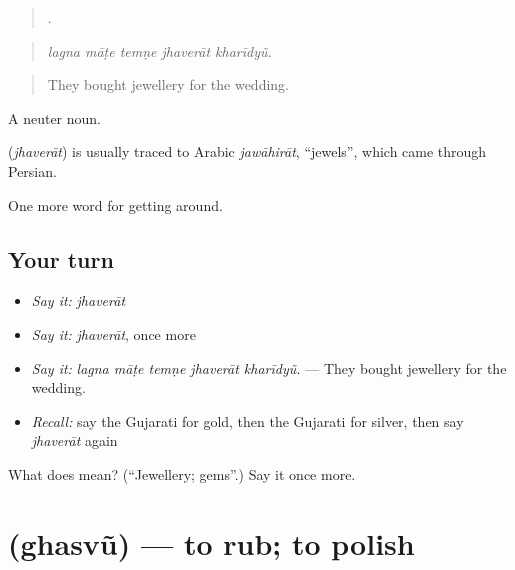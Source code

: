 \begin{quote}
    .
\end{quote}

\begin{quote}
\emph{lagna māṭe temṇe jhaverāt kharīdyũ.}
\end{quote}

\begin{quote}
They bought jewellery for the wedding.
\end{quote}

A neuter noun.

\begin{cousinweb}
\textbf{} (\emph{jhaverāt}) is usually traced to Arabic \emph{jawāhirāt}, \textquotedblleft{}jewels\textquotedblright{}, which came through Persian.
\end{cousinweb}

\begin{grammarlens}[title={What you've built}]
One more word for getting around.
\end{grammarlens}

\subsection*{Your turn}
\begin{itemize}
\raggedright
  \item \emph{Say it:} \emph{jhaverāt}
  \item \emph{Say it:} \emph{jhaverāt}, once more
  \item \emph{Say it:} \emph{lagna māṭe temṇe jhaverāt kharīdyũ.} — They bought jewellery for the wedding.
  \item \emph{Recall:} say the Gujarati for gold, then the Gujarati for silver, then say \emph{jhaverāt} again
\end{itemize}

\begin{tcolorbox}[breakable,colback=teal!4,colframe=teal!35!black,title={Before you move on}]
What does  mean? (\textquotedblleft{}Jewellery; gems\textquotedblright{}.) Say it once more.
\end{tcolorbox}
\section[\texorpdfstring{\gu{ઘસવું} (ghasvũ)}{ઘસવું (ghasvũ)}]{ (ghasvũ) — to rub; to polish}

\label{lesson:GU-C432-ghasvu}



